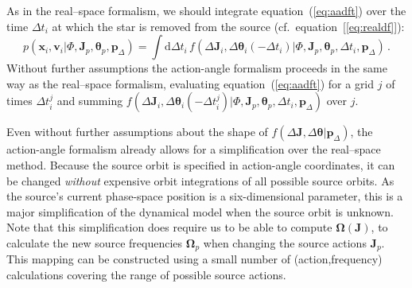 \documentclass[12pt,preprint]{aastex}
\newcommand{\dd}{\mathrm{d}}
\newcommand{\eqnname}{equation}
\renewcommand{\vec}[1]{\ensuremath{\mathbf{#1}}}
\newcommand{\vecx}{\ensuremath{\vec{x}}}
\newcommand{\vecv}{\ensuremath{\vec{v}}}
\newcommand{\vecj}{\ensuremath{\vec{J}}}
\newcommand{\veco}{\ensuremath{\vec{\Omega}}}
\newcommand{\veca}{\ensuremath{\boldsymbol\theta}}
\newcommand{\paramsdiff}{\ensuremath{\vec{p}_\Delta}}
\begin{document}
As in the real--space formalism, we should integrate
\eqnname~(\ref{eq:aadft}) over the time $\Delta t_i$ at which the star
is removed from the source (cf.~\eqnname~[\ref{eq:realdf}]):
\begin{equation}\label{eq:aadf}
  p(\vecx_i,\vecv_i | \Phi,\vecj_p,\veca_p,\paramsdiff) = \int \dd
  \Delta t_i\, f(\Delta \vecj_i,\Delta \veca_i(-\Delta t_i) |
  \Phi,\vecj_p,\veca_p,\Delta t_i,\paramsdiff) \,.
\end{equation}
Without further assumptions the action-angle formalism proceeds in the
same way as the real--space formalism, evaluating
\eqnname~(\ref{eq:aadft}) for a grid $j$ of times $\Delta t_i^j$ and
summing $f(\Delta \vecj_i,\Delta \veca_i(-\Delta t^j_i) |
\Phi,\vecj_p,\veca_p,\Delta t_i,\paramsdiff)$ over $j$.

Even without further assumptions about the shape of $f(\Delta
\vecj,\Delta \veca|\paramsdiff)$, the action-angle formalism already
allows for a simplification over the real--space method. Because the
source orbit is specified in action-angle coordinates, it can be
changed \emph{without} expensive orbit integrations of all possible
source orbits. As the source's current phase-space position is a
six-dimensional parameter, this is a major simplification of the
dynamical model when the source orbit is unknown. Note that this
simplification does require us to be able to compute $\veco(\vecj)$,
to calculate the new source frequencies $\veco_p$ when changing the
source actions $\vecj_p$. This mapping can be constructed using a
small number of (action,frequency) calculations covering the range of
possible source actions.
\end{document}
